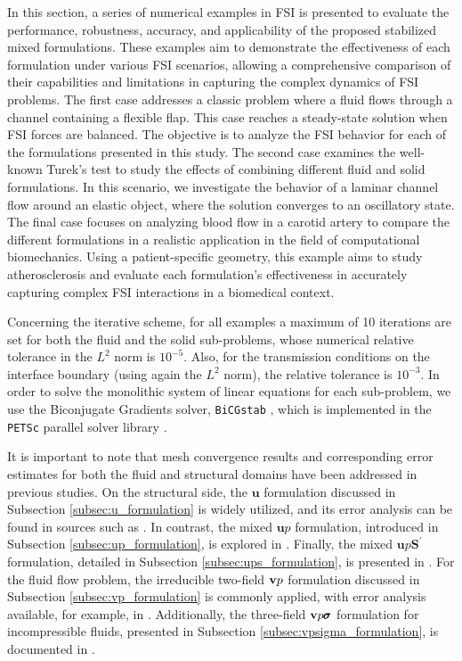 \documentclass[11pt,english]{article}
\def\devPK{\pmb{S}^\prime}                      %
\def\u{{\pmb u}}                            %
\def\ups{\pmb{u} p \devPK}
\def\up{\pmb{u} p}
\def\vpsigma{\vb{v}p\pmb{\sigma}}
\def\vp{\vb{v}p}
\begin{document}
In this section, a series of numerical examples in FSI is presented to evaluate the performance, robustness, accuracy, and applicability of the proposed stabilized mixed formulations. These examples aim to demonstrate the effectiveness of each formulation under various FSI scenarios, allowing a comprehensive comparison of their capabilities and limitations in capturing the complex dynamics of FSI problems. The first case addresses a classic problem where a fluid flows through a channel containing a flexible flap. This case reaches a steady-state solution when FSI forces are balanced. The objective is to analyze the FSI behavior for each of the formulations presented in this study. The second case examines the well-known Turek’s test \cite{turektest} to study the effects of combining different fluid and solid formulations. In this scenario, we investigate the behavior of a laminar channel flow around an elastic object, where the solution converges to an oscillatory state. The final case focuses on analyzing blood flow in a carotid artery to compare the different formulations in a realistic application in the field of computational biomechanics. Using a patient-specific geometry, this example aims to study atherosclerosis and evaluate each formulation’s effectiveness in accurately capturing complex FSI interactions in a biomedical context.

Concerning the iterative scheme, for all examples a maximum of 10 iterations are set for both the fluid and the solid sub-problems, whose numerical relative tolerance in the $L^2$ norm is $10^{-5}$. Also, for the transmission conditions on the interface boundary (using again the $L^2$ norm), the relative tolerance is $10^{-3}$. In order to solve the monolithic system of linear equations for each sub-problem, we use the Biconjugate Gradients solver, \texttt{BiCGstab} \cite{BiconjugateGradientSolver}, which is implemented in the \texttt{PETSc} parallel solver library \cite{PETScHomePage}.

It is important to note that mesh convergence results and corresponding error estimates for both the fluid and structural domains have been addressed in previous studies. On the structural side, the $\u$ formulation discussed in Subsection \ref{subsec:u_formulation} is widely utilized, and its error analysis can be found in sources such as \cite{Bonet}. In contrast, the mixed $\up$ formulation, introduced in Subsection \ref{subsec:up_formulation}, is explored in \cite{Castanar2020}. Finally, the mixed $\ups$ formulation, detailed in Subsection \ref{subsec:ups_formulation}, is presented in \cite{Castanar2023}. For the fluid flow problem, the irreducible two-field $\vp$ formulation discussed in Subsection \ref{subsec:vp_formulation} is commonly applied, with error analysis available, for example, in \cite{blasco2001space,codina2002analysis}. Additionally, the three-field $\vpsigma$ formulation for incompressible fluids, presented in Subsection \ref{subsec:vpsigma_formulation}, is documented in \cite{castillo2014}.
\end{document}

